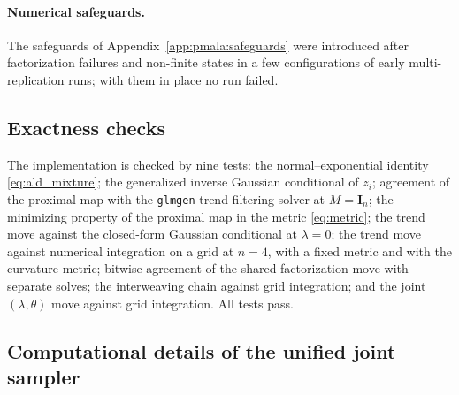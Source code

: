 \paragraph{Numerical safeguards.} The safeguards of Appendix~\ref{app:pmala:safeguards} were introduced after factorization failures and non-finite states in a few configurations of early multi-replication runs; with them in place no run failed.

\subsection{Exactness checks}
\label{app:pmala:tests}

The implementation is checked by nine tests: the normal--exponential identity \eqref{eq:ald_mixture}; the generalized inverse Gaussian conditional of $z_i$; agreement of the proximal map with the \texttt{glmgen} trend filtering solver \citep{tibshirani2014adaptive} at $M = \mathbf{I}_n$; the minimizing property of the proximal map in the metric \eqref{eq:metric}; the trend move against the closed-form Gaussian conditional at $\lambda = 0$; the trend move against numerical integration on a grid at $n = 4$, with a fixed metric and with the curvature metric; bitwise agreement of the shared-factorization move with separate solves; the interweaving chain against grid integration; and the joint $(\lambda,\theta)$ move against grid integration. All tests pass.

\subsection{Computational details of the unified joint sampler}
\label{app:pmala:joint}

